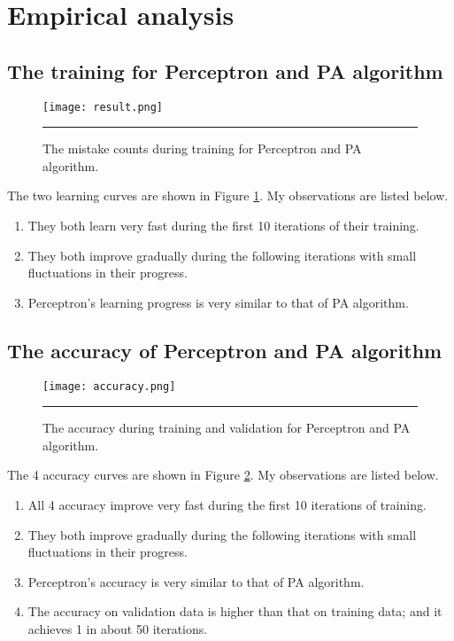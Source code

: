 \documentclass[12pt]{article}
\begin{document}
\section{Empirical analysis}
\subsection{The training for Perceptron and PA algorithm}
\begin{figure}[htb]
  \centering
      {\texttt{[image: result.png]}} \rule{1\linewidth}{1pt}
      \caption{The mistake counts during training for Perceptron and PA algorithm.}
      \label{fig:result}
\end{figure}
The two learning curves are shown in Figure \ref{fig:result}. My observations are listed below.
\begin{enumerate}
  \item They both learn very fast during the first 10 iterations of their training.
  \item They both improve gradually during the following iterations with small fluctuations in their progress.
  \item Perceptron's learning progress is very similar to that of PA algorithm.
\end{enumerate}
\subsection{The accuracy of Perceptron and PA algorithm}
\begin{figure}[htb]
  \centering
      {\texttt{[image: accuracy.png]}} \rule{1\linewidth}{1pt}
      \caption{The accuracy during training and validation for Perceptron and PA algorithm.}
      \label{fig:accuracy}
\end{figure}
The 4 accuracy curves are shown in Figure \ref{fig:accuracy}. My observations are listed below.
\begin{enumerate}
  \item All 4 accuracy improve very fast during the first 10 iterations of training.
  \item They both improve gradually during the following iterations with small fluctuations in their progress.
  \item Perceptron's accuracy is very similar to that of PA algorithm.
  \item The accuracy on validation data is higher than that on training data; and it achieves 1 in about 50 iterations.
\end{enumerate}
\end{document}
